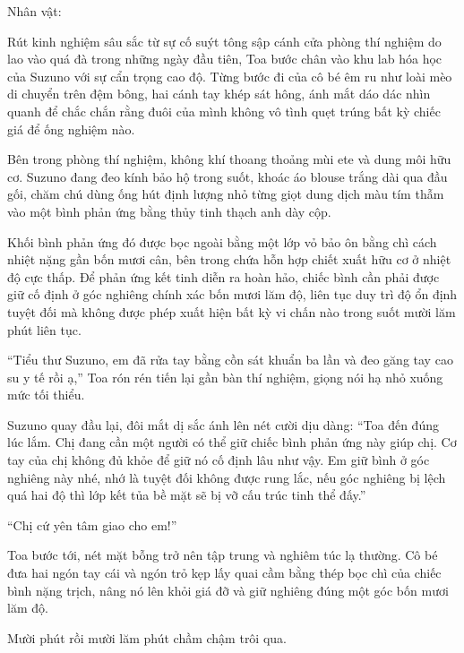 \documentclass[../main.tex]{subfiles}
\begin{document}
\newpage

\begin{center}
  {\caviar\fontsize{12pt}{12pt}\selectfont Nhân vật:  }
\end{center}

Rút kinh nghiệm sâu sắc từ sự cố suýt tông sập cánh cửa phòng thí nghiệm do lao vào quá đà trong những ngày đầu tiên, Toa bước chân vào khu lab hóa học của Suzuno với sự cẩn trọng cao độ. Từng bước đi của cô bé êm ru như loài mèo di chuyển trên đệm bông, hai cánh tay khép sát hông, ánh mắt dáo dác nhìn quanh để chắc chắn rằng đuôi của mình không vô tình quẹt trúng bất kỳ chiếc giá để ống nghiệm nào.

Bên trong phòng thí nghiệm, không khí thoang thoảng mùi ete và dung môi hữu cơ. Suzuno đang đeo kính bảo hộ trong suốt, khoác áo blouse trắng dài qua đầu gối, chăm chú dùng ống hút định lượng nhỏ từng giọt dung dịch màu tím thẫm vào một bình phản ứng bằng thủy tinh thạch anh dày cộp.

Khối bình phản ứng đó được bọc ngoài bằng một lớp vỏ bảo ôn bằng chì cách nhiệt nặng gần bốn mươi cân, bên trong chứa hỗn hợp chiết xuất hữu cơ ở nhiệt độ cực thấp. Để phản ứng kết tinh diễn ra hoàn hảo, chiếc bình cần phải được giữ cố định ở góc nghiêng chính xác bốn mươi lăm độ, liên tục duy trì độ ổn định tuyệt đối mà không được phép xuất hiện bất kỳ vi chấn nào trong suốt mười lăm phút liên tục.

``Tiểu thư Suzuno, em đã rửa tay bằng cồn sát khuẩn ba lần và đeo găng tay cao su y tế rồi ạ,'' Toa rón rén tiến lại gần bàn thí nghiệm, giọng nói hạ nhỏ xuống mức tối thiểu.

Suzuno quay đầu lại, đôi mắt dị sắc ánh lên nét cười dịu dàng: ``Toa đến đúng lúc lắm. Chị đang cần một người có thể giữ chiếc bình phản ứng này giúp chị. Cơ tay của chị không đủ khỏe để giữ nó cố định lâu như vậy. Em giữ bình ở góc nghiêng này nhé, nhớ là tuyệt đối không được rung lắc, nếu góc nghiêng bị lệch quá hai độ thì lớp kết tủa bề mặt sẽ bị vỡ cấu trúc tinh thể đấy.''

``Chị cứ yên tâm giao cho em!''

Toa bước tới, nét mặt bỗng trở nên tập trung và nghiêm túc lạ thường. Cô bé đưa hai ngón tay cái và ngón trỏ kẹp lấy quai cầm bằng thép bọc chì của chiếc bình nặng trịch, nâng nó lên khỏi giá đỡ và giữ nghiêng đúng một góc bốn mươi lăm độ.

Mười phút rồi mười lăm phút chầm chậm trôi qua.
\end{document}
